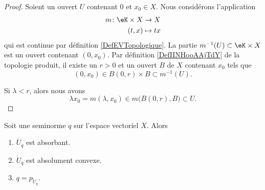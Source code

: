 \begin{proof}
	Soient un ouvert \( U\) contenant \( 0\) et \( x_0\in X\). Nous considérons l'application
	\begin{equation}
		\begin{aligned}
			m\colon \eK\times X & \to X      \\
			(t,x)               & \mapsto tx
		\end{aligned}
	\end{equation}
	qui est continue par définition \ref{DefEVTopologique}. La partie \( m^{-1}(U)\subset \eK\times X\) est un ouvert contenant \( (0,x_0)\). Par définition \ref{DefIINHooAAjTdY} de la topologie produit, il existe un \( r>0\) et un ouvert \( B\) de \( X\) contenant \( x_0\) tels que
	\begin{equation}
		(0,x_0)\in B(0,r)\times B\subset m^{-1}(U).
	\end{equation}

	Si \( \lambda< r\), alors nous avons
	\begin{equation}
		\lambda x_0=m(\lambda, x_0)\in m\big( B(0,r),B \big)\subset U.
	\end{equation}
\end{proof}


\begin{lemma}		\label{LEMooFWCIooVwGutp}
	Soit une seminorme \( q\) sur l'espace vectoriel \( X\). Alors
	\begin{enumerate}
		\item
		      \( \mathring{U}_q\) est absorbant.
		\item
		      \( \mathring{U}_q\) est absolument convexe.
		\item
		      \( q=p_{\mathring{U}_q}\).
	\end{enumerate}
\end{lemma}

